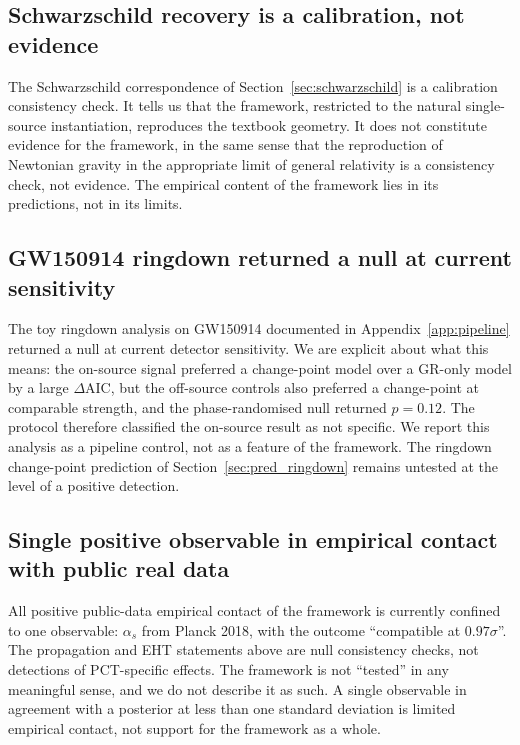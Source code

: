 ﻿\documentclass[12pt,a4paper]{article}
\theoremstyle{definition}
\begin{document}
\subsection{Schwarzschild recovery is a calibration, not evidence}

The Schwarzschild correspondence of Section~\ref{sec:schwarzschild} is a calibration consistency check. It tells us that the framework, restricted to the natural single-source instantiation, reproduces the textbook geometry. It does not constitute evidence for the framework, in the same sense that the reproduction of Newtonian gravity in the appropriate limit of general relativity is a consistency check, not evidence. The empirical content of the framework lies in its predictions, not in its limits.

\subsection{GW150914 ringdown returned a null at current sensitivity}

The toy ringdown analysis on GW150914 documented in Appendix~\ref{app:pipeline} returned a null at current detector sensitivity. We are explicit about what this means: the on-source signal preferred a change-point model over a GR-only model by a large $\Delta\mathrm{AIC}$, but the off-source controls also preferred a change-point at comparable strength, and the phase-randomised null returned $p = 0.12$. The protocol therefore classified the on-source result as not specific. We report this analysis as a pipeline control, not as a feature of the framework. The ringdown change-point prediction of Section~\ref{sec:pred_ringdown} remains untested at the level of a positive detection.

\subsection{Single positive observable in empirical contact with public real data}

All positive public-data empirical contact of the framework is currently confined to one observable: $\alpha_s$ from Planck 2018, with the outcome ``compatible at $0.97\sigma$''. The propagation and EHT statements above are null consistency checks, not detections of PCT-specific effects. The framework is not ``tested'' in any meaningful sense, and we do not describe it as such. A single observable in agreement with a posterior at less than one standard deviation is limited empirical contact, not support for the framework as a whole.
\end{document}
